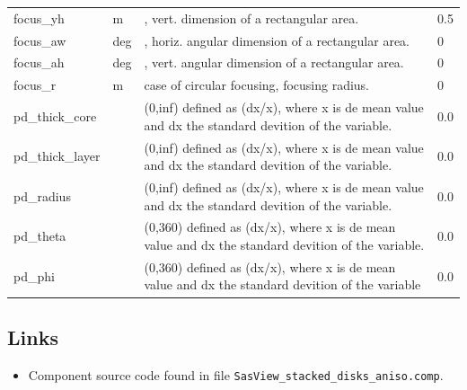 \begin{longtable}{p{}p{}p{}p{}}
focus\_yh & m & , vert. dimension of a rectangular area. & 0.5 \\
focus\_aw & deg & , horiz. angular dimension of a rectangular area. & 0 \\
focus\_ah & deg & , vert. angular dimension of a rectangular area. & 0 \\
focus\_r & m & case of circular focusing, focusing radius. & 0 \\
pd\_thick\_core &  & (0,inf) defined as (dx/x), where x is de mean value and dx the standard devition of the variable. & 0.0 \\
pd\_thick\_layer &  & (0,inf) defined as (dx/x), where x is de mean value and dx the standard devition of the variable. & 0.0 \\
pd\_radius &  & (0,inf) defined as (dx/x), where x is de mean value and dx the standard devition of the variable. & 0.0 \\
pd\_theta &  & (0,360) defined as (dx/x), where x is de mean value and dx the standard devition of the variable. & 0.0 \\
pd\_phi &  & (0,360) defined as (dx/x), where x is de mean value and dx the standard devition of the variable & 0.0 \\
\bottomrule
\end{longtable}

\subsection*{Links}
\begin{itemize}
  \item Component source code found in file \texttt{SasView\_stacked\_disks\_aniso.comp}.
\end{itemize}
